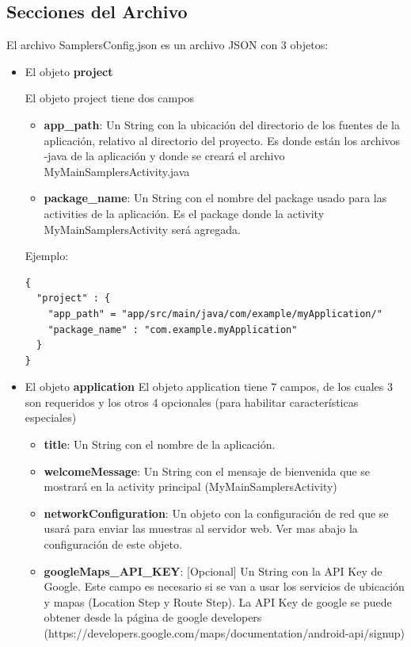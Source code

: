 \subsection{Secciones del Archivo}

El archivo SamplersConfig.json es un archivo JSON con 3 objetos:
\begin{itemize}
	\item El objeto \textbf{project}
		
	El objeto project tiene dos campos
	\begin{itemize}
		\item \textbf{app\_path}: Un String con la ubicación del directorio de los fuentes de la aplicación, relativo al directorio del proyecto. Es donde están los archivos -java de la aplicación y donde se creará el archivo MyMainSamplersActivity.java
		\item \textbf{package\_name}: Un String con el nombre del package usado para las activities de la aplicación. Es el package donde la activity MyMainSamplersActivity será agregada.
	\end{itemize}
	
Ejemplo:
\begin{lstlisting}[language=XML, frame=tlb]	
{
  "project" : {
    "app_path" = "app/src/main/java/com/example/myApplication/"
    "package_name" : "com.example.myApplication"
  }
}
\end{lstlisting}	
	
	\item El objeto \textbf{application}
	El objeto application tiene 7 campos, de los cuales 3 son requeridos y los otros 4 opcionales (para habilitar características especiales)
	\begin{itemize}
		\item \textbf{title}: Un String con el nombre de la aplicación.
		
		 \item \textbf{welcomeMessage}: Un String con el mensaje de bienvenida que se mostrará en la activity principal (MyMainSamplersActivity)
		 
		 \item \textbf{networkConfiguration}: Un objeto con la configuración de red que se usará para enviar las muestras al servidor web. Ver mas abajo la configuración de este objeto.
		 
		 \item \textbf{googleMaps\_API\_KEY}: [Opcional] Un String con la API Key de Google. Este campo es necesario si se van a usar los servicios de ubicación y mapas (Location Step y Route Step). La API Key de google se puede obtener desde la página de google developers (https://developers.google.com/maps/documentation/android-api/signup)
		 

\end{itemize}
\end{itemize}
